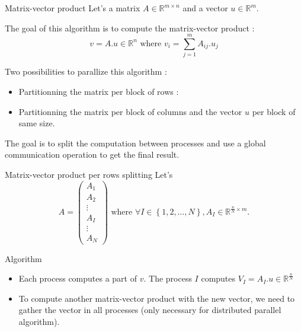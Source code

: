 \documentclass[compress,10pt,aspectratio=169]{beamer}
\begin{document}
\begin{frame}[fragile]{Matrix-vector product}
  \scriptsize
  Let's a matrix $A\in\mathbb{R}^{m\times n}$ and a vector $u\in\mathbb{R}^{m}$.

  The goal of this algorithm is to compute the matrix-vector product :
  \[
  v = A.u\in\mathbb{R}^{n}\mbox{ where } v_{i} = \sum_{j=1}^{m} A_{ij}.u_{j}
  \]
  
  Two possibilities to parallize this algorithm :
  \begin{itemize}
  \item Partitionning the matrix per block of rows :
  \item Partitionning the matrix per block of columns and the vector $u$ per block of same size.
  \end{itemize}

  The goal is to split the computation between processes and use a global communication operation
  to get the final result.

\end{frame}

\begin{frame}[fragile]{Matrix-vector product per rows splitting}
  \scriptsize
  Let's
  \[
  A = \left(\begin{array}{c}
    A_{1} \\ \hline
    A_{2} \\ \hline
    \vdots \\ \hline
    A_{I} \\ \hline
    \vdots \\ \hline
    A_{N}
    \end{array}
  \right)
  \mbox{ where } \forall I\in\left\{1,2,\ldots,N\right\}, A_{I}\in\mathbb{R}^{\frac{n}{N}\times m}.
    \]

    \begin{exampleblock}{Algorithm}
      \begin{itemize}
      \item Each process computes a part of $v$. The process $I$ computes 
        $\displaystyle
        V_{I} = A_{I}.u \in \mathbb{R}^{\frac{n}{N}}
        $ 
      \item To compute another matrix-vector product with the new vector, we need to gather the vector
            in all processes (only necessary for distributed parallel algorithm).
      \end{itemize}
    \end{exampleblock}
  
\end{frame}
\end{document}
